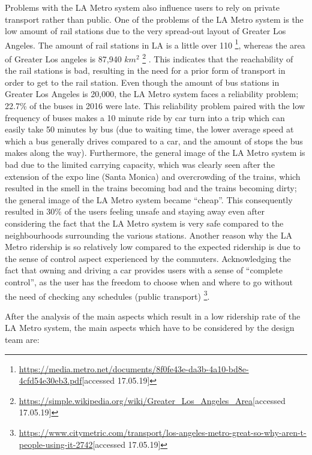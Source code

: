 Problems with the LA Metro system also influence users to rely on private transport rather than public. One of the problems of the LA Metro system is the low amount of rail stations due to the very spread-out layout of Greater Los Angeles. The amount of rail stations in LA is a little over 110 \footnote{\url{https://media.metro.net/documents/8f0fe43e-da3b-4a10-bd8e-4cfd54e30eb3.pdf}[accessed 17.05.19]}, whereas the area of Greater Los angeles is 87,940 $km^{2}$ \footnote{\url{https://simple.wikipedia.org/wiki/Greater_Los_Angeles_Area}[accessed 17.05.19]} . This indicates that the reachability of the rail stations is bad, resulting in the need for a prior form of transport in order to get to the rail station. Even though the amount of bus stations in Greater Los Angeles is 20,000, the LA Metro system faces a reliability problem; 22.7\% of the buses in 2016 were late. This reliability problem paired with the low frequency of buses makes a 10 minute ride by car turn into a trip which can easily take 50 minutes by bus (due to waiting time, the lower average speed at which a bus generally drives compared to a car, and the amount of stops the bus makes along the way). Furthermore, the general image of the LA Metro system is bad due to the limited carrying capacity, which was clearly seen after the extension of the expo line (Santa Monica) and overcrowding of the trains, which resulted in the smell in the trains becoming bad and the trains becoming dirty; the general image of the LA Metro system became “cheap”. This consequently resulted in 30\% of the users feeling unsafe and staying away even after considering the fact that the LA Metro system is very safe compared to the neighbourhoods surrounding the various stations. Another reason why the LA Metro ridership is so relatively low compared to the expected ridership is due to the sense of control aspect experienced by the commuters. Acknowledging the fact that owning and driving a car provides users with a sense of “complete control”, as the user has the freedom to choose when and where to go without the need of checking any schedules (public transport) \footnote{\url{https://www.citymetric.com/transport/los-angeles-metro-great-so-why-aren-t-people-using-it-2742}[accessed 17.05.19]}. 

After the analysis of the main aspects which result in a low ridership rate of the LA Metro system, the main aspects which have to be considered by the design team are:


